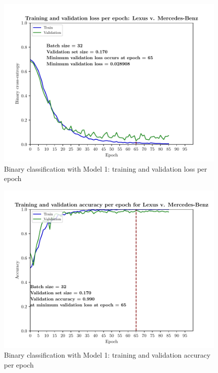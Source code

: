 \documentclass[conference]{IEEEtran}
\begin{document}
\begin{figure}[ht]
    \centering
    \includegraphics[scale=0.48]{main_08_binary_classification_00_Lexus_Mercedes-Benz__model_1loss.pdf}
    \caption{Binary classification with Model 1: training and validation loss per epoch}
    \label{fig:loss}
\end{figure}

\begin{figure}[ht]
    \centering
    \includegraphics[scale=0.48]{main_08_binary_classification_00_Lexus_Mercedes-Benz__model_1accuracy.pdf}
    \caption{Binary classification with Model 1: training and validation accuracy per epoch}
    \label{fig:acc}
\end{figure}
\end{document}
